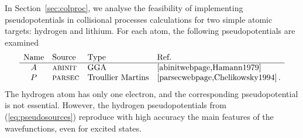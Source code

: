 \documentclass[10pt]{article}
\begin{document}
In Section~\ref{sec:colproc}, we analyse the feasibility of 
implementing pseudopotentials in collisional processes calculations 
for two simple atomic targets: hydrogen and lithium. For each atom, 
the following pseudopotentials are examined
\begin{equation}
 \begin{array}{clll}
  \mbox{Name} & \mbox{Source} & \mbox{Type} & \mbox{Ref.} \\
  \hline  
  A & \mbox{\sc abinit} & \mbox{GGA} & \cite{abinitwebpage,Hamann1979} \\
  P & \mbox{\sc parsec} & \mbox{Troullier Martins} & \cite{parsecwebpage,Chelikowsky1994}\,.
 \end{array}
 \label{eq:pseudosources}
\end{equation}
The hydrogen atom has only one electron, and the corresponding 
pseudopotential is not essential. However, the hydrogen 
pseudopotentials from (\ref{eq:pseudosources}) reproduce with high 
accuracy the main features of the wavefunctions, even for excited 
states.
\end{document}
